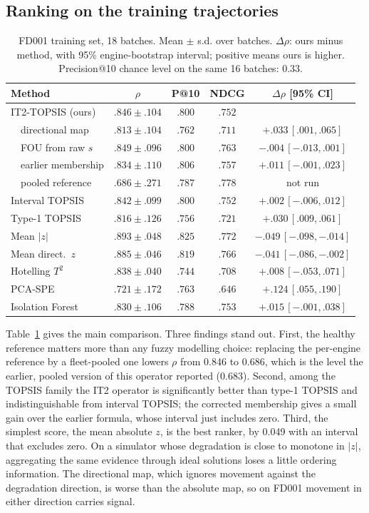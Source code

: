 \documentclass[journal,10pt,twocolumn]{IEEEtran}
\begin{document}
\subsection{Ranking on the training trajectories}
\begin{table}[t]
\centering
\footnotesize
\caption{FD001 training set, 18 batches. Mean $\pm$ s.d. over batches. $\Delta\rho$: ours minus method, with 95\% engine-bootstrap interval; positive means ours is higher. Precision@10 chance level on the same 16 batches: 0.33.}
\label{tab:rank}
\setlength{\tabcolsep}{2pt}
\begin{tabular}{lcccc}
\toprule
Method & $\rho$ & P@10 & NDCG & $\Delta\rho$ [95\% CI] \\
\midrule
IT2-TOPSIS (ours) & $.846\pm.104$ & $.800$ & $.752$ & \\
\ \ directional map & $.813\pm.104$ & $.762$ & $.711$ & $+.033\,[.001,.065]$ \\
\ \ FOU from raw $s$ & $.849\pm.096$ & $.800$ & $.763$ & $-.004\,[-.013,.001]$ \\
\ \ earlier membership & $.834\pm.110$ & $.806$ & $.757$ & $+.011\,[-.001,.023]$ \\
\ \ pooled reference & $.686\pm.271$ & $.787$ & $.778$ & not run \\
Interval TOPSIS & $.842\pm.099$ & $.800$ & $.752$ & $+.002\,[-.006,.012]$ \\
Type-1 TOPSIS & $.816\pm.126$ & $.756$ & $.721$ & $+.030\,[.009,.061]$ \\
Mean $|z|$ & $.893\pm.048$ & $.825$ & $.772$ & $-.049\,[-.098,-.014]$ \\
Mean direct.\ $z$ & $.885\pm.046$ & $.819$ & $.766$ & $-.041\,[-.086,-.002]$ \\
Hotelling $T^2$ & $.838\pm.040$ & $.744$ & $.708$ & $+.008\,[-.053,.071]$ \\
PCA-SPE & $.721\pm.172$ & $.763$ & $.646$ & $+.124\,[.055,.190]$ \\
Isolation Forest & $.830\pm.106$ & $.788$ & $.753$ & $+.015\,[-.001,.038]$ \\
\bottomrule
\end{tabular}
\end{table}
Table~\ref{tab:rank} gives the main comparison. Three findings stand out. First, the healthy reference matters more than any fuzzy modelling choice: replacing the per-engine reference by a fleet-pooled one lowers $\rho$ from 0.846 to 0.686, which is the level the earlier, pooled version of this operator reported (0.683). Second, among the TOPSIS family the IT2 operator is significantly better than type-1 TOPSIS and indistinguishable from interval TOPSIS; the corrected membership gives a small gain over the earlier formula, whose interval just includes zero. Third, the simplest score, the mean absolute $z$, is the best ranker, by 0.049 with an interval that excludes zero. On a simulator whose degradation is close to monotone in $|z|$, aggregating the same evidence through ideal solutions loses a little ordering information. The directional map, which ignores movement against the degradation direction, is worse than the absolute map, so on FD001 movement in either direction carries signal.
\end{document}
